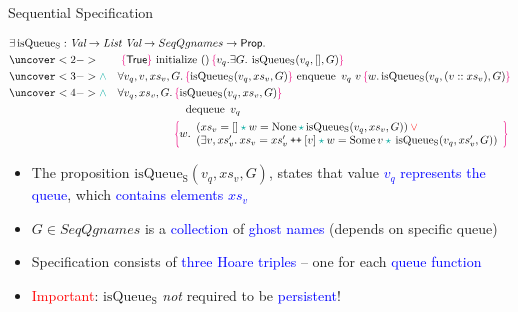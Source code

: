 \documentclass[9pt,xcolor={dvipsnames}]{beamer}
\newcommand{\initialise}{\operatorname{initialize}}
\newcommand{\enqueue}{\operatorname{enqueue}}
\newcommand{\dequeue}{\operatorname{dequeue}}
\newcommand{\isqueueseq}{\operatorname{isQueue_{S}}}
\newcommand{\SeqQgnames}{SeqQgnames}
\newcommand{\vq}{v_q}
\newcommand{\nodeval}{\valB}
\newcommand{\absvalue}{\val}
\newcommand{\absvalueList}{xs_v}
\newcommand{\Qg}{G}
\newcommand\catenate{\mathbin{\text{\ttfamily\upshape ++}}}
\newcommand{\seqspecinitHTGen}[2]{\hoare{\TRUE}{\initialise \ \TT}{#1 . \Exists #2. \isqueueseq(#1, [], #2)}}
\newcommand{\seqspecinitGen}[2]{\seqspecinitHTGen{#1}{#2}}
\newcommand{\seqspecinit}{\seqspecinitGen{\vq}{\Qg}}
\newcommand{\seqspecenqHT}[4]{\hoare{\isqueueseq(#1, #3, #4)}{\enqueue \ #1 \ #2}{\valB . \isqueueseq(#1, (#2 :: #3), #4)}}
\newcommand{\seqspecenqGen}[4]{\All #1, #2, #3, #4. \seqspecenqHT{#1}{#2}{#3}{#4}}
\newcommand{\seqspecenq}{\seqspecenqGen{\vq}{\absvalue}{\absvalueList}{\Qg}}
\newcommand{\seqspecdeqHT}[3]{\hoareV[t]{\isqueueseq(#1, #2, #3)}{\dequeue \ #1}{\nodeval . \begin{array}{l}(#2 = [] \star{} \nodeval = \None \star{} \isqueueseq(#1, #2, #3)) \lor{}\\ (\Exists \absvalue, #2' . #2 = #2' \catenate [\absvalue] \star{} \nodeval = \Some \absvalue \star{} \isqueueseq(#1, #2', #3)) \end{array}}}
\newcommand{\seqspecdeqGen}[3]{\All #1, #2, #3. \seqspecdeqHT{#1}{#2}{#3}}
\newcommand{\seqspecdeq}{\seqspecdeqGen{\vq}{\absvalueList}{\Qg}}
\let\oldlor\lor
\renewcommand{\lor}{\begingroup \color{red} \oldlor \endgroup}
\let\oldland\land
\renewcommand{\land}{\begingroup \color{Emerald} \oldland \endgroup}
\let\oldstar\star
\renewcommand{\star}{\begingroup \color{Emerald} \oldstar \endgroup}
\begin{document}
\begin{frame}{Sequential Specification}
  \begin{definition}\label{QueueSpecs:spec:seq}
    \setlength\abovedisplayskip{-8pt}
    \setlength\belowdisplayskip{2pt}
    \begin{align*}
      &\Exists \isqueueseq : \Val \to \List ~ \Val \to \SeqQgnames \to \Prop.\\
      &\uncover<2->{\quad\quad\seqspecinit}\\
      &\uncover<3->{\land{}\quad\seqspecenq}\\
      &\uncover<4->{\land{}\quad\seqspecdeq}
    \end{align*}
  \end{definition}
  \begin{itemize}
    \item The proposition \textcolor{RubineRed}{$\isqueueseq(\vq, \absvalueList, \Qg)$}, states that value \textcolor{blue}{$\vq$ represents the queue}, which \textcolor{blue}{contains elements $\absvalueList$}
    \item $G \in \SeqQgnames{}$ is a \textcolor{blue}{collection} of \textcolor{blue}{ghost names} (depends on specific queue)
    \item Specification consists of \textcolor{blue}{three Hoare triples} -- one for each \textcolor{blue}{queue function}
    \item \textcolor{red}{Important}: $\isqueueseq$ \textit{not} required to be \textcolor{blue}{persistent}!
  \end{itemize}
\end{frame}
\end{document}
